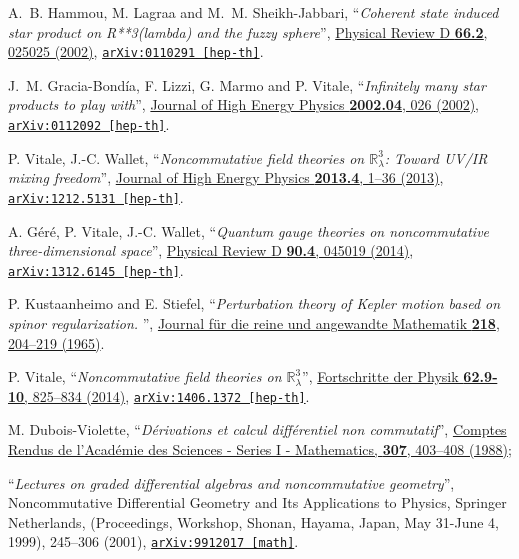 \documentclass[a4paper,11pt,twoside]{article}
\numberwithin{equation}{section}
\newcommand{\doi}[2]{\href{http://dx.doi.org/#1}{#2}}
\newcommand{\arxiv}[3]{\href{#3}{\texttt{arXiv:#1 [#2]}}}
\theoremstyle{nonumberplain}
\newcounter{and}
\begin{document}
\begin{thebibliography}{88}
% 
A.~B. Hammou, M. Lagraa and M.~M. Sheikh-Jabbari, %
``\emph{Coherent state induced star product on R**3(lambda) and the fuzzy sphere}'', %
\doi{10.1103/PhysRevD.66.025025}{Physical Review D \textbf{66.2}, 025025 (2002)}, %
\arxiv{0110291}{hep-th}{http://arxiv.org/abs/hep-th/0110291}.%

%
J.~M. Gracia-Bond\'ia, F. Lizzi, G. Marmo and P. Vitale, %
``\emph{Infinitely many star products to play with}'', %
\doi{1126-6708/2002/04/026/}{Journal of High Energy Physics \textbf{2002.04}, 026 (2002)}, %
\arxiv{0112092}{hep-th}{http://arxiv.org/abs/hep-th/0112092}.%

% 
P. Vitale, J.-C. Wallet, %
``\emph{Noncommutative field theories on $\mathbb{R}^3_\lambda$: Toward UV/IR mixing freedom}'', %
\doi{10.1007/JHEP04(2013)115}{Journal of High Energy Physics \textbf{2013.4}, 1--36 (2013)}, %
\arxiv{1212.5131}{hep-th}{http://arxiv.org/abs/1212.5131}.%

% 
A. G\'er\'e, P. Vitale, J.-C. Wallet,%
``\emph{Quantum gauge theories on noncommutative three-dimensional space}'', %
\doi{10.1103/PhysRevD.90.045019}{Physical Review D \textbf{90.4}, 045019 (2014)}, %
\arxiv{1312.6145}{hep-th}{http://arxiv.org/abs/1312.6145}.%

%
P. Kustaanheimo and E. Stiefel, %
``\emph{Perturbation theory of Kepler motion based on spinor regularization. }'', %
\href{http://gdz.sub.uni-goettingen.de/dms/resolveppn/?PPN=GDZPPN00218124X}{Journal für die reine und angewandte Mathematik \textbf{218}, 204--219 (1965)}.%

% 
P. Vitale, %
``\emph{Noncommutative field theories on $\mathbb{R}^3_\lambda$}'', %
\doi{10.1002/prop.201400037}{Fortschritte der Physik \textbf{62.9‐10}, 825--834 (2014)}, %
\arxiv{1406.1372}{hep-th}{http://arxiv.org/abs/1406.1372}.%

%
M. Dubois-Violette, %
``\emph{Dérivations et calcul différentiel non commutatif}'', %
\href{http://patriciadv.free.fr/MDV/Publications_files/88-19.pdf}{Comptes Rendus de l'Académie des Sciences - Series I - Mathematics, \textbf{307}, 403--408 (1988)};\par%
``\emph{Lectures on graded differential algebras and noncommutative geometry}'', %
Noncommutative Differential Geometry and Its Applications to Physics, Springer Netherlands, (Proceedings, Workshop, Shonan, Hayama, Japan, May 31-June 4, 1999), 245--306 (2001), %
\arxiv{9912017}{math}{http://arxiv.org/abs/math/9912017}.%


\end{thebibliography}
\end{document}
